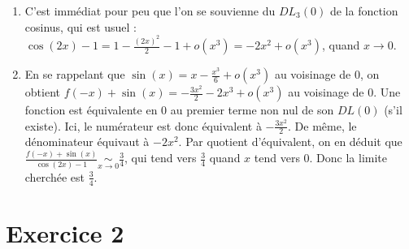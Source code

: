\documentclass[12pt,a4paper]{article}
\begin{document}
\begin{enumerate}
	\item C'est immédiat pour peu que l'on se souvienne du $DL_3(0)$ de la fonction cosinus, qui est usuel : $\displaystyle \cos(2x) - 1 = 1 -\frac{(2x)^2}{2} - 1 + o(x^3) = -2x^2 + o(x^3)$, quand $x \to 0$.
	
	\vspace{0.5\baselineskip}
	
	\item En se rappelant que $\displaystyle \sin(x) = x -\frac{x^3}{6} + o(x^3)$ au voisinage de $0$, on obtient $\displaystyle f(-x) + \sin(x) = -\frac{3x^2}{2} - 2x^3 + o(x^3)$ au voisinage de $0$. Une fonction est équivalente en $0$ au premier terme non nul de son $DL(0)$ (s'il existe). Ici, le numérateur est donc équivalent à $-\frac{3x^2}{2}$. De même, le dénominateur équivaut à $-2x^2$. Par quotient d'équivalent, on en déduit que $\displaystyle \frac{f(-x) + \sin(x)}{\cos(2x)-1} \underset{x \to 0}{\sim} \frac{3}{4}$, qui tend vers $\displaystyle \frac{3}{4}$ quand $x$ tend vers $0$. Donc la limite cherchée est $\displaystyle \frac{3}{4}$.
	
	
\end{enumerate}




\thispagestyle{empty}

\section*{Exercice 2}
\end{document}
